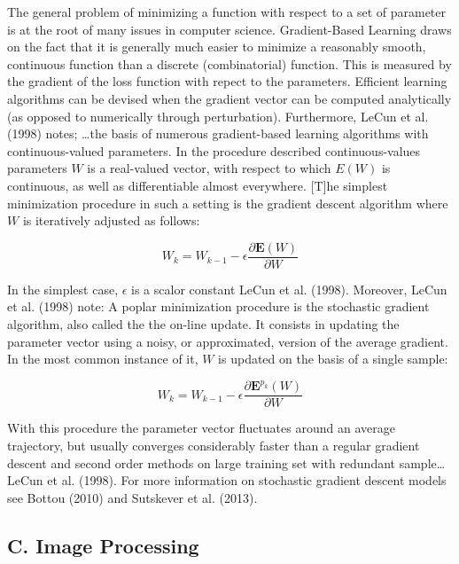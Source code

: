 \documentclass[conference,final,]{IEEEtran}
\begin{document}
The general problem of minimizing a function with respect to a set of
parameter is at the root of many issues in computer science.
Gradient-Based Learning draws on the fact that it is generally much
easier to minimize a reasonably smooth, continuous function than a
discrete (combinatorial) function. This is measured by the gradient of
the loss function with repect to the parameters. Efficient learning
algorithms can be devised when the gradient vector can be computed
analytically (as opposed to numerically through perturbation).
Furthermore, LeCun et al. (1998) notes; \ldots{}the basis of numerous
gradient-based learning algorithms with continuous-valued parameters. In
the procedure described continuous-values parameters \(W\) is a
real-valued vector, with respect to which \(E(W)\) is continuous, as
well as differentiable almost everywhere. {[}T{]}he simplest
minimization procedure in such a setting is the gradient descent
algorithm where \(W\) is iteratively adjusted as follows:

\begin{equation}
    W_k =  W_{k-1}-\epsilon\frac{\partial \mathbf{E}(W)}{\partial W}
\end{equation}

In the simplest case, \(\epsilon\) is a scalor constant LeCun et al.
(1998). Moreover, LeCun et al. (1998) note: A poplar minimization
procedure is the stochastic gradient algorithm, also called the the
on-line update. It consists in updating the parameter vector using a
noisy, or approximated, version of the average gradient. In the most
common instance of it, \(W\) is updated on the basis of a single sample:

\begin{equation}
    W_k =  W_{k-1}-\epsilon\frac{\partial \mathbf{E}^{p_k}(W)}{\partial W}
\end{equation}

With this procedure the parameter vector fluctuates around an average
trajectory, but usually converges considerably faster than a regular
gradient descent and second order methods on large training set with
redundant sample\ldots{}LeCun et al. (1998). For more information on
stochastic gradient descent models see Bottou (2010) and Sutskever et
al. (2013).

\subsection{C. Image Processing}\label{c.-image-processing}
\end{document}
